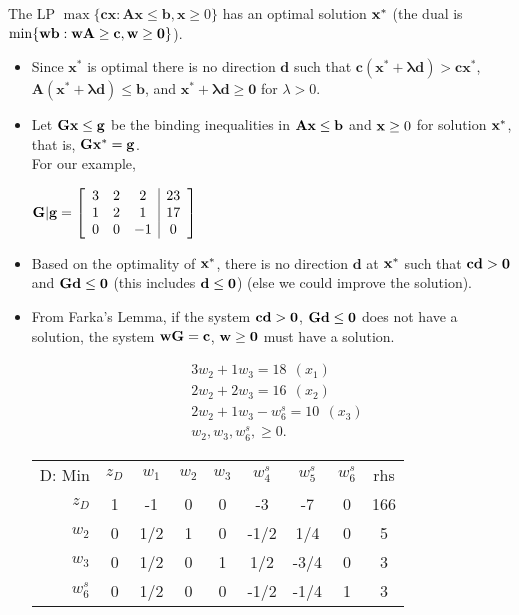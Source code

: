 The LP $\max\{\mathbf{cx}: \mathbf{Ax} \le \mathbf{b}, \mathbf{x} \ge 0\}$ has an optimal solution ${\bf x^*}$ (the dual is $\min\{{\bf wb}: {\bf wA} \ge {\bf c}, {\bf w} \ge {\bf 0}\}$).



\begin{itemize}
\item Since $\mathbf{x^*}$ is optimal there is no direction $\mathbf{d}$ such that $\mathbf{c(x^* + \lambda d)} > \mathbf{cx^*}$, $\mathbf{A(x^*+ \lambda d)} \le \mathbf{b}$, and $\mathbf{x^*+ \lambda d} \ge \mathbf{0}$ for $\lambda > 0$.
\item Let ${\bf Gx } \le {\bf g}$ be the binding inequalities in $\mathbf{Ax} \le {\bf b}$ and ${\bf x} \ge 0$ for solution ${\bf x^*}$, that is, ${\bf Gx^*} = {\bf g}$. \\

For our example, 

${\bf G|g} = \left[ \begin{array}{ccc|c}
 3 & 2 & 2  & 23\\
 1 &  2&  1 & 17\\
 0 &  0 &  -1 & 0\\

\end{array} \right]$



\item Based on the optimality of ${\bf x^*}$, there is no direction $\mathbf{d}$ at ${\bf x^*}$ such that ${\bf cd} > {\bf 0}$ and ${\bf Gd} \le {\bf 0}$ (this includes ${\bf d} \le {\bf 0}$) (else we could improve the solution).
\item From Farka's Lemma, if the system ${\bf cd} > {\bf 0}$, ${\bf Gd} \le {\bf 0}$ does not have a solution, the system ${\bf wG} = {\bf c}$, ${\bf w} \ge {\bf 0}$ must have a solution.

\begin{align*}
& 3w_2 + 1w_3 = 18 ~~ (x_1) \\
& 2w_2 + 2w_3 = 16 ~~ (x_2)\\
& 2w_2 + 1w_3 - w^{s}_6 = 10 ~~ (x_3)\\
&  w_2, w_3, w^{s}_6, \ge 0. 
\end{align*}

\begin{center} \begin{tabular} {r|c|c|c|c|c|c|c|c|} \cline{2-9}  
D: Min& $z_D$ 	& $w_1$ 	& $w_2$ 	& $w_3$ 	& $w^{s}_4$ 	& $w^{s}_5$ 	& $w^{s}_6$ 	& rhs   \\ \cline{2-9} \cline{2-9}  
$z_D$ 	& 1    	& -1    	& 0     	& 0     	& -3    	& -7    	& 0     	& 166   \\ \cline{2-9}  
$w_2$	& 0    	& 1/2   	& 1     	& 0     	& -1/2  	& 1/4  	& 0     	& 5     \\ \cline{2-9}   
$w_3$ 	& 0    	& 1/2   	& 0     	& 1     	& 1/2  	& -3/4   	& 0     	& 3    \\ \cline{2-9}   
$w^{s}_6$	& 0    	& 1/2   	& 0     	& 0     	& -1/2   	& -1/4  	& 1     	& 3     \\ \cline{2-9} 
\end{tabular} \end{center}


\end{itemize}
